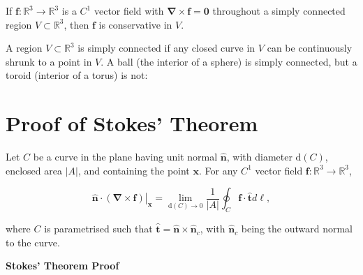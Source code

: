 \begin{corollary}
  If \(\boldsymbol{f}: \mathbb{R}^3 \rightarrow \mathbb{R}^3\) is a \(C^1\) vector field with \(\boldsymbol{\nabla} \times \boldsymbol{f}=\mathbf{0}\) throughout a simply connected region \(V \subset \mathbb{R}^3\), then \(\boldsymbol{f}\) is conservative in \(V\).
\end{corollary}

\begin{proofidea}
  
  
\begin{formalproof}
  
\end{formalproof}
  
\end{proofidea}

\begin{definition}
  A region \(V \subset \mathbb{R}^3\) is simply connected if any closed curve in \(V\) can be continuously shrunk to a point in \(V\). A ball (the interior of a sphere) is simply connected, but a toroid (interior of a torus) is not:
\end{definition}

\section{Proof of Stokes' Theorem}

\begin{lemma}
  Let \(C\) be a curve in the plane having unit normal \(\hat{\boldsymbol{n}}\), with diameter \(\mathrm{d}(C)\), enclosed area \(|A|\), and containing the point \(\boldsymbol{x}\). For any \(C^1\) vector field \(\boldsymbol{f}: \mathbb{R}^3 \rightarrow \mathbb{R}^3\),

\[
\left.\hat{\boldsymbol{n}} \cdot(\boldsymbol{\nabla} \times \boldsymbol{f})\right|_{\boldsymbol{x}}=\lim _{\mathrm{d}(C) \rightarrow 0} \frac{1}{|A|} \oint_C \boldsymbol{f} \cdot \hat{\boldsymbol{t}} d \ell,
\]

where \(C\) is parametrised such that \(\hat{\boldsymbol{t}}=\hat{\boldsymbol{n}} \times \hat{\boldsymbol{n}}_c\), with \(\hat{\boldsymbol{n}}_c\) being the outward normal to the curve.
\end{lemma}

\begin{proofidea}
  
  
\begin{formalproof}
  
\end{formalproof}
  
\end{proofidea}

\textbf{Stokes' Theorem Proof}

\begin{proofidea}
  
  
\begin{formalproof}
  
\end{formalproof}
  
\end{proofidea}
